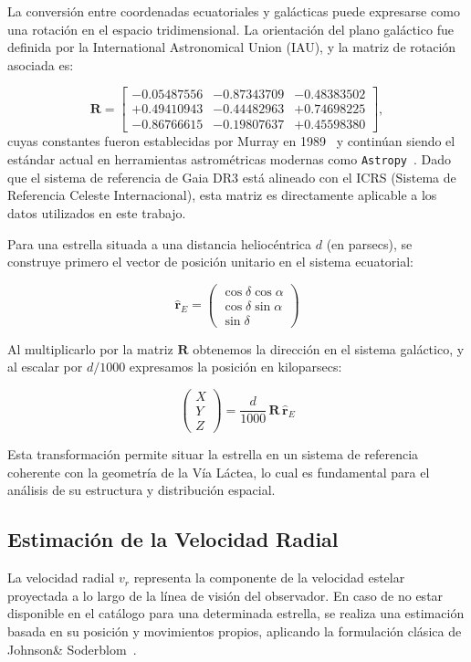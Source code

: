 La conversión entre coordenadas ecuatoriales y galácticas puede expresarse como una rotación en el espacio tridimensional.
La orientación del plano galáctico fue definida por la International Astronomical Union (IAU), y la matriz de rotación asociada es:

\[
    \mathbf{R} =
    \begin{bmatrix}
        -0.05487556 & -0.87343709 & -0.48383502 \\
        +0.49410943 & -0.44482963 & +0.74698225 \\
        -0.86766615 & -0.19807637 & +0.45598380
    \end{bmatrix},
\]
cuyas constantes fueron establecidas por Murray en 1989~\cite{murray1989_coordinates} y continúan siendo el estándar actual en herramientas astrométricas modernas como \texttt{Astropy}~\cite{astropy:2022}.
Dado que el sistema de referencia de Gaia DR3 está alineado con el ICRS (Sistema de Referencia Celeste Internacional), esta matriz es directamente aplicable a los datos utilizados en este trabajo.

Para una estrella situada a una distancia heliocéntrica $d$ (en parsecs), se construye primero el vector de posición unitario en el sistema ecuatorial:

\[
    \hat{\mathbf{r}}_E =
    \begin{pmatrix}
        \cos \delta \cos \alpha \\
        \cos \delta \sin \alpha \\
        \sin \delta
    \end{pmatrix}
\]

Al multiplicarlo por la matriz $\mathbf{R}$ obtenemos la dirección en el sistema galáctico, y al escalar por $d/1000$ expresamos la posición en kiloparsecs:

\[
    \begin{pmatrix}
        X \\ Y \\ Z
    \end{pmatrix}
    =
    \frac{d}{1000}\,
    \mathbf{R}\,
    \hat{\mathbf{r}}_E
\]

Esta transformación permite situar la estrella en un sistema de referencia coherente con la geometría de la Vía Láctea, lo cual es fundamental para el análisis de su estructura y distribución espacial.

\subsection{Estimación de la Velocidad Radial}\label{subsec:estimacion-de-la-velocidad-radial}
La velocidad radial \( v_r \) representa la componente de la velocidad estelar proyectada a lo largo de la línea de visión del observador.
En caso de no estar disponible en el catálogo para una determinada estrella, se realiza una estimación basada en su posición y movimientos propios, aplicando la formulación clásica de Johnson\& Soderblom~\cite{johnson1987}.

